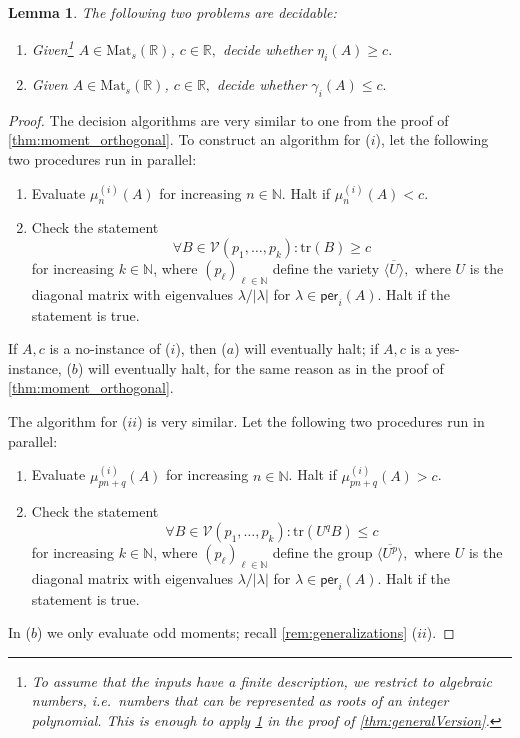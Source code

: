\documentclass[11pt]{article}
\newtheorem{lemma}[theorem]{Lemma}
\theoremstyle{definition}
\newcommand{\tr}{\mathrm{tr}}
\begin{document}
\begin{lemma}\label{lem:mu_eta_decidability}
The following two problems are decidable:
\begin{enumerate}[label=$(\roman*)$]
	\item\label{prob1:lemma} Given\footnote{To assume that the inputs have a finite description, we restrict to algebraic numbers, i.e.\ numbers that can be represented as roots of an integer polynomial. This is enough to apply \cref{lem:mu_eta_decidability} in the proof of \cref{thm:generalVersion}.} $A \in \mathrm{Mat}_s(\mathbb{R})$, $c \in \mathbb{R},$ decide whether $\eta_i(A) \geqslant c.$
	\item\label{prob2:lemma} Given $A \in \mathrm{Mat}_s(\mathbb{R})$, $c \in \mathbb{R},$ decide whether $\gamma_i(A) \leqslant c.$
\end{enumerate}
\end{lemma}
\begin{proof}
The decision algorithms are very similar to one from the proof of \cref{thm:moment_orthogonal}. To construct an algorithm for ($i$), let the following two procedures run in parallel:
\begin{enumerate}[label=($\alph*$)]
	\item\label{alg1a} Evaluate $\mu_n^{(i)}(A)$ for increasing $n \in \mathbb{N}$. Halt if $\mu_n^{(i)}(A) < c$.
	\item\label{alg2a} Check the statement
	$$ \forall B \in \mathcal{V}(p_1, \ldots, p_k)\colon \tr(B) \geqslant c$$
	for increasing $k \in \mathbb{N}$, where $(p_\ell)_{\ell \in \mathbb{N}}$ define the variety $\overline{\langle U \rangle},$ where $U$ is the diagonal matrix with eigenvalues $\lambda/|\lambda|$ for $\lambda \in \mathsf{per}_i(A)$. Halt if the statement is true.
\end{enumerate}
If $A,c$ is a no-instance of ($i$), then ($a$) will eventually halt; if $A,c$ is a yes-instance, ($b$) will eventually halt, for the same reason as in the proof of \cref{thm:moment_orthogonal}.

The algorithm for ($ii$)  is very similar. Let the following two procedures run in parallel:
\begin{enumerate}[label=($\alph*$)]
	\item\label{alg1b} Evaluate $\mu_{pn+q}^{(i)}(A)$ for increasing $n \in \mathbb{N}$. Halt if $\mu_{pn+q}^{(i)}(A) > c$.
	\item\label{alg2b} Check  the statement
	$$ \forall B \in \mathcal{V}(p_1, \ldots, p_k)\colon \tr(U^qB) \leqslant c$$
	for increasing $k \in \mathbb{N}$, where $(p_\ell)_{\ell \in \mathbb{N}}$ define the group $\overline{\langle U^p \rangle},$ where $U$ is the diagonal matrix with eigenvalues $\lambda/|\lambda|$ for $\lambda \in \mathsf{per}_i(A)$. Halt if the statement is true.
\end{enumerate}
In ($b$) we only evaluate odd moments; recall  \cref{rem:generalizations} ($ii$). 
\end{proof}
\end{document}
